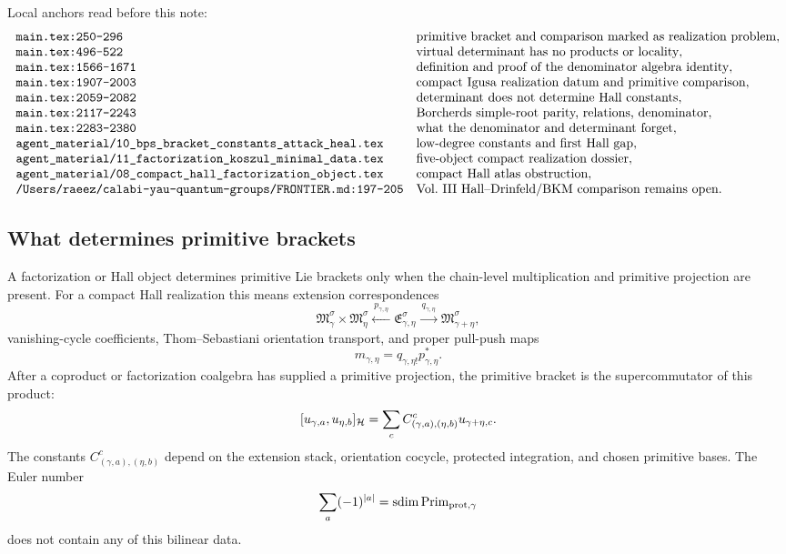 Local anchors read before this note:
\[
\begin{array}{ll}
\texttt{main.tex:250--296} & \hbox{primitive bracket and comparison marked as realization problem},\\
\texttt{main.tex:496--522} & \hbox{virtual determinant has no products or locality},\\
\texttt{main.tex:1566--1671} & \hbox{definition and proof of the denominator algebra identity},\\
\texttt{main.tex:1907--2003} & \hbox{compact Igusa realization datum and primitive comparison},\\
\texttt{main.tex:2059--2082} & \hbox{determinant does not determine Hall constants},\\
\texttt{main.tex:2117--2243} & \hbox{Borcherds simple-root parity, relations, denominator},\\
\texttt{main.tex:2283--2380} & \hbox{what the denominator and determinant forget},\\
\texttt{agent\_material/10\_bps\_bracket\_constants\_attack\_heal.tex} &
\hbox{low-degree constants and first Hall gap},\\
\texttt{agent\_material/11\_factorization\_koszul\_minimal\_data.tex} &
\hbox{five-object compact realization dossier},\\
\texttt{agent\_material/08\_compact\_hall\_factorization\_object.tex} &
\hbox{compact Hall atlas obstruction},\\
\texttt{/Users/raeez/calabi-yau-quantum-groups/FRONTIER.md:197--205} &
\hbox{Vol.~III Hall--Drinfeld/BKM comparison remains open}.
\end{array}
\]

\subsection{What determines primitive brackets}

A factorization or Hall object determines primitive Lie brackets only when
the chain-level multiplication and primitive projection are present.  For a
compact Hall realization this means extension correspondences
\[
\mathfrak M_\gamma^\sigma\times\mathfrak M_\eta^\sigma
\xleftarrow{\ p_{\gamma,\eta}\ }
\mathfrak E_{\gamma,\eta}^\sigma
\xrightarrow{\ q_{\gamma,\eta}\ }
\mathfrak M_{\gamma+\eta}^\sigma ,
\]
vanishing-cycle coefficients, Thom--Sebastiani orientation transport, and
proper pull-push maps
\[
m_{\gamma,\eta}=q_{\gamma,\eta!}p_{\gamma,\eta}^{*}.
\]
After a coproduct or factorization coalgebra has supplied a primitive
projection, the primitive bracket is the supercommutator of this product:
\[
[u_{\gamma,a},u_{\eta,b}]_{\mathcal H}
=
\sum_c C^c_{(\gamma,a),(\eta,b)}u_{\gamma+\eta,c}.
\]
The constants \(C^c_{(\gamma,a),(\eta,b)}\) depend on the extension stack,
orientation cocycle, protected integration, and chosen primitive bases.  The
Euler number
\[
\sum_a(-1)^{|a|}=\operatorname{sdim} \operatorname{Prim}_{\mathrm{prot},\gamma}
\]
does not contain any of this bilinear data.

